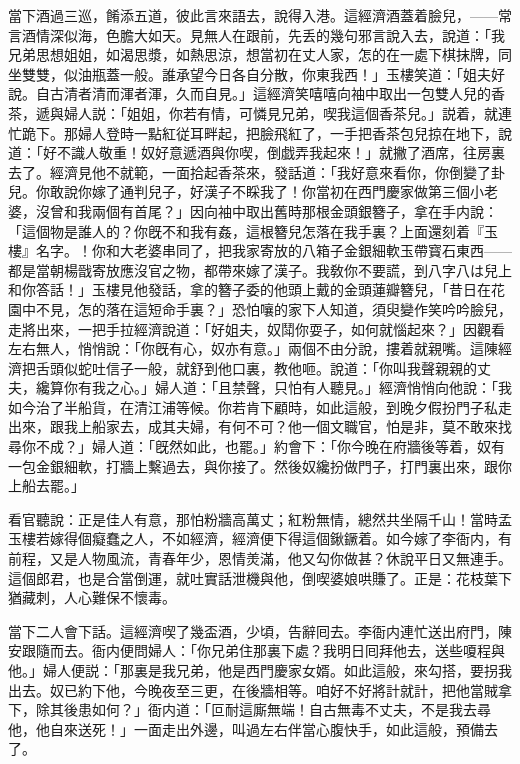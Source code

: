 當下酒過三巡，餚添五道，彼此言來語去，說得入港。這經濟酒蓋着臉兒，——常言酒情深似海，色膽大如天。見無人在跟前，先丢的幾句邪言說入去，說道：「我兄弟思想姐姐，如渴思漿，如熱思涼，想當初在丈人家，怎的在一處下棋抹牌，同坐雙雙，似油瓶蓋一般。誰承望今日各自分散，你東我西！」玉樓笑道：「姐夫好說。自古清者清而渾者渾，久而自見。」這經濟笑嘻嘻向袖中取出一包雙人兒的香茶，遞與婦人説：「姐姐，你若有情，可憐見兄弟，喫我這個香茶兒。」説着，就連忙跪下。那婦人登時一點紅従耳畔起，把臉飛紅了，一手把香茶包兒掠在地下，說道：「好不識人敬重！奴好意遞酒與你喫，倒戯弄我起來！」就撇了酒席，往房裏去了。經濟見他不就範，一面拾起香茶來，發話道：「我好意來看你，你倒變了卦兒。你敢說你嫁了通判兒子，好漢子不睬我了！你當初在西門慶家做第三個小老婆，沒曾和我兩個有首尾？」因向袖中取出舊時那根金頭銀簪子，拿在手内說：「這個物是誰人的？你旣不和我有姦，這根簪兒怎落在我手裏？上面還刻着『玉樓』名字。！你和大老婆串同了，把我家寄放的八箱子金銀細軟玉帶寳石東西——都是當朝楊戩寄放應沒官之物，都帶來嫁了漢子。我敎你不要謊，到八字八は兒上和你答話！」玉樓見他發話，拿的簪子委的他頭上戴的金頭蓮瓣簪兒，「昔日在花園中不見，怎的落在這短命手裏？」恐怕嚷的家下人知道，須臾變作笑吟吟臉兒，走將出來，一把手拉經濟說道：「好姐夫，奴鬦你耍子，如何就惱起來？」因觀看左右無人，悄悄說：「你旣有心，奴亦有意。」兩個不由分說，摟着就親嘴。這陳經濟把舌頭似蛇吐信子一般，就舒到他口裏，教他咂。說道：「你叫我聲親親的丈夫，纔算你有我之心。」婦人道：「且禁聲，只怕有人聽見。」經濟悄悄向他說：「我如今治了半船貨，在清江浦等候。你若肯下顧時，如此這般，到晚夕假扮門子私走出來，跟我上船家去，成其夫婦，有何不可？他一個文職官，怕是非，莫不敢來找尋你不成？」婦人道：「旣然如此，也罷。」約會下：「你今晚在府牆後等着，奴有一包金銀細軟，打牆上繫過去，與你接了。然後奴纔扮做門子，打門裏出來，跟你上船去罷。」

看官聽說：正是佳人有意，那怕粉牆高萬丈；紅粉無情，總然共坐隔千山！當時孟玉樓若嫁得個癡蠢之人，不如經濟，經濟便下得這個鍬鐝着。如今嫁了李衙内，有前程，又是人物風流，青春年少，恩情羙滿，他又勾你做甚？休說平日又無連手。這個郎君，也是合當倒運，就吐實話泄機與他，倒喫婆娘哄賺了。正是：花枝葉下猶藏刺，人心難保不懷毒。

當下二人會下話。這經濟喫了幾盃酒，少頃，告辭囘去。李衙内連忙送出府門，陳安跟隨而去。衙内便問婦人：「你兄弟住那裏下處？我明日囘拜他去，送些嗄程與他。」婦人便説：「那裏是我兄弟，他是西門慶家女婿。如此這般，來勾搭，要拐我出去。奴已約下他，今晚夜至三更，在後牆相等。咱好不好將計就計，把他當賊拿下，除其後患如何？」衙内道：「叵耐這廝無端！自古無毒不丈夫，不是我去尋他，他自來送死！」一面走出外邊，叫過左右伴當心腹快手，如此這般，預備去了。

